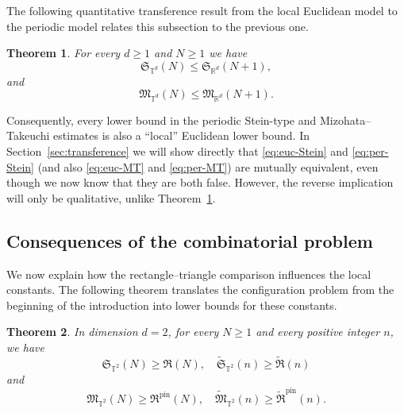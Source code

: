 \documentclass[11pt,reqno]{amsart}
\newtheorem{theorem}{Theorem}[section]
\numberwithin{equation}{section}
\renewcommand{\le}{\leqslant}
\renewcommand{\geq}{\geqslant}
\renewcommand{\ge}{\geqslant}
\begin{document}
The following quantitative transference result from the local Euclidean model to the periodic model relates this subsection to the previous one.

\begin{theorem}\label{thm:quant-transference-intro}
For every $d\ge1$ and $N\ge1$ we have
\begin{equation}\label{eq:St-transference}
\mathfrak{S}_{\mathbb{T}^d}(N)\le \mathfrak{S}_{\mathbb{R}^d}(N+1),
\end{equation}
and
\begin{equation}\label{eq:MT-transference}
\mathfrak{M}_{\mathbb{T}^d}(N)\le \mathfrak{M}_{\mathbb{R}^d}(N+1).
\end{equation}
\end{theorem}

Consequently, every lower bound in the periodic Stein-type and Mizohata--Takeuchi estimates is also a ``local'' Euclidean lower bound.
In Section~\ref{sec:transference} we will show directly that \eqref{eq:euc-Stein} and \eqref{eq:per-Stein} (and also \eqref{eq:euc-MT} and \eqref{eq:per-MT}) are mutually equivalent, even though we now know that they are both false. However, the reverse implication will only be qualitative, unlike Theorem~\ref{thm:quant-transference-intro}.

\subsection{Consequences of the combinatorial problem}
We now explain how the rectangle--triangle comparison influences the local constants. The following theorem translates the configuration problem from the beginning of the introduction into lower bounds for these constants.

\begin{theorem}\label{thm:config-lower-intro}
In dimension $d=2$, for every $N\geq1$ and every positive integer $n$, we have
\begin{equation}\label{eq:Stein-config-lower-intro}
\mathfrak{S}_{\mathbb{T}^2}(N)\geq\mathfrak{R}(N), \quad \widetilde{\mathfrak{S}}_{\mathbb{T}^2}(n)\geq\widetilde{\mathfrak{R}}(n)
\end{equation}
and
\begin{equation}\label{eq:MT-config-lower-intro}
\mathfrak{M}_{\mathbb{T}^2}(N)\geq\mathfrak{R}^{\mathrm{pin}}(N), \quad \widetilde{\mathfrak{M}}_{\mathbb{T}^2}(n)\geq\widetilde{\mathfrak{R}}^{\mathrm{pin}}(n).
\end{equation}
\end{theorem}
\end{document}
